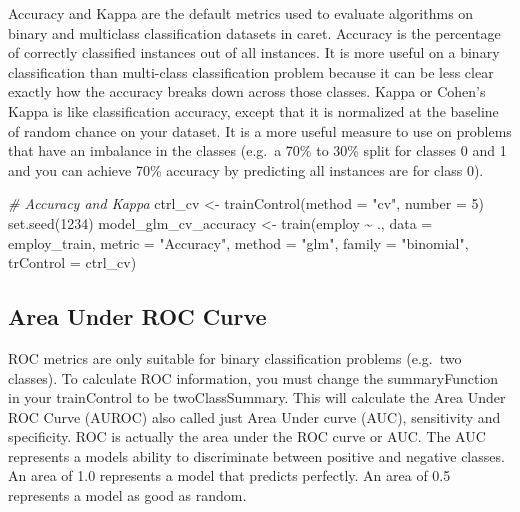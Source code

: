 \documentclass[
]{book}
\newenvironment{Shaded}{\begin{snugshade}}{\end{snugshade}}
\newcommand{\AttributeTok}[1]{\textcolor[rgb]{0.77,0.63,0.00}{#1}}
\newcommand{\CommentTok}[1]{\textcolor[rgb]{0.56,0.35,0.01}{\textit{#1}}}
\newcommand{\DecValTok}[1]{\textcolor[rgb]{0.00,0.00,0.81}{#1}}
\newcommand{\FunctionTok}[1]{\textcolor[rgb]{0.00,0.00,0.00}{#1}}
\newcommand{\NormalTok}[1]{#1}
\newcommand{\OtherTok}[1]{\textcolor[rgb]{0.56,0.35,0.01}{#1}}
\newcommand{\SpecialCharTok}[1]{\textcolor[rgb]{0.00,0.00,0.00}{#1}}
\newcommand{\StringTok}[1]{\textcolor[rgb]{0.31,0.60,0.02}{#1}}
\begin{document}
Accuracy and Kappa are the default metrics used to evaluate algorithms on binary and multiclass classification datasets in caret. Accuracy is the percentage of correctly classified instances out of all instances. It is more useful on a binary classification than multi-class classification problem because it can be less clear exactly how the accuracy breaks down across those classes.
Kappa or Cohen's Kappa is like classification accuracy, except that it is normalized at the baseline of random chance on your dataset. It is a more useful measure to use on problems that have an imbalance in the classes (e.g.~a 70\% to 30\% split for classes 0 and 1 and you can
achieve 70\% accuracy by predicting all instances are for class 0).

\begin{Shaded}
\begin{Highlighting}[]
\CommentTok{\# Accuracy and Kappa}
\NormalTok{ctrl\_cv }\OtherTok{\textless{}{-}} \FunctionTok{trainControl}\NormalTok{(}\AttributeTok{method =} \StringTok{"cv"}\NormalTok{, }\AttributeTok{number =} \DecValTok{5}\NormalTok{)}
\FunctionTok{set.seed}\NormalTok{(}\DecValTok{1234}\NormalTok{)}
\NormalTok{model\_glm\_cv\_accuracy }\OtherTok{\textless{}{-}} \FunctionTok{train}\NormalTok{(employ }\SpecialCharTok{\textasciitilde{}}\NormalTok{ .,}
                        \AttributeTok{data =}\NormalTok{ employ\_train,}
                        \AttributeTok{metric =} \StringTok{"Accuracy"}\NormalTok{,}
                        \AttributeTok{method =} \StringTok{"glm"}\NormalTok{, }\AttributeTok{family =} \StringTok{"binomial"}\NormalTok{,}
                        \AttributeTok{trControl =}\NormalTok{ ctrl\_cv)}
\end{Highlighting}
\end{Shaded}

\hypertarget{area-under-roc-curve}{%
\subsection{Area Under ROC Curve}\label{area-under-roc-curve}}

ROC metrics are only suitable for binary classification problems (e.g.~two classes). To calculate ROC information, you must change the summaryFunction in your trainControl to be twoClassSummary. This will calculate the Area Under ROC Curve (AUROC) also called just Area Under curve (AUC), sensitivity and specificity.
ROC is actually the area under the ROC curve or AUC. The AUC represents a models
ability to discriminate between positive and negative classes. An area of 1.0 represents a model that predicts perfectly. An area of 0.5 represents a model as good as random.
\end{document}
